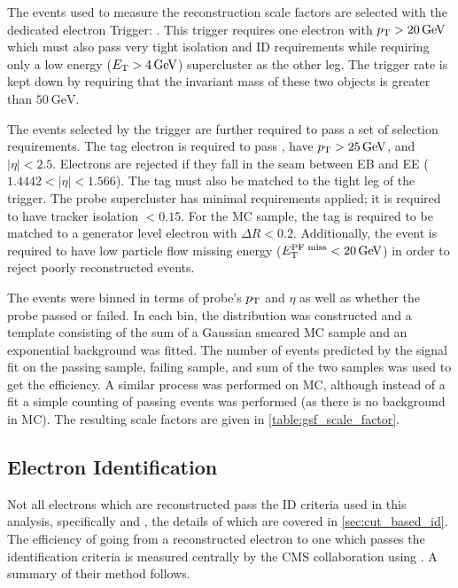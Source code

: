 The events used to measure the reconstruction scale factors are selected with
the dedicated electron \TnP Trigger: \TnPTrigger. This trigger requires one
electron with $\pt > \SI{20}{\GeV}$ which must also pass very tight isolation
and ID requirements while requiring only a low energy ($\et > \SI{4}{\GeV}$)
supercluster as the other leg. The trigger rate is kept down by requiring that
the invariant mass of these two objects is greater than $\SI{50}{\GeV}$.

The events selected by the trigger are further required to pass a set of
selection requirements. The tag electron is required to pass \EGTIGHT, have
$\pt > \SI{25}{\GeV}$, and $|\eta| < 2.5$. Electrons are rejected if they fall
in the seam between EB and EE ($1.4442 < |\eta| < 1.566$). The tag must also be
matched to the tight leg of the \TnP trigger. The probe supercluster has
minimal requirements applied; it is required to have tracker isolation $<
0.15$. For the MC sample, the tag is required to be matched to a generator
level electron with $\Delta R < 0.2$. Additionally, the event is required to
have low particle flow missing energy ($\PFMET < \SI{20}{\GeV}$) in order to
reject poorly reconstructed events.

The events were binned in terms of probe's $p_{\mathrm{T}}$ and $\eta$ as well as whether
the probe passed or failed. In each bin, the \mee distribution was constructed
and a template consisting of the sum of a Gaussian smeared \Ztoee MC sample and
an exponential background was fitted. The number of events predicted by the
signal fit on the passing sample, failing sample, and sum of the two samples
was used to get the efficiency. A similar process was performed on MC, although
instead of a fit a simple counting of passing events was performed (as there is
no background in MC). The resulting scale factors are given in
\cref{table:gsf_scale_factor}.



\subsection{Electron Identification}
\label{ssec:sf_id}

Not all electrons which are reconstructed pass the ID criteria used in this
analysis, specifically \EGMEDIUM and \EGTIGHT, the details of which are covered
in \cref{sec:cut_based_id}. The efficiency of going from a
reconstructed electron to one which passes the identification criteria is
measured centrally by the CMS collaboration using \TnP \cite{cms_an_2014-055}.
A summary of their method follows.

